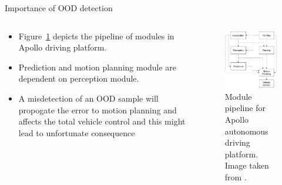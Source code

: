 \documentclass[aspectratio=169]{beamer}
\begin{document}
\begin{frame}{Importance of OOD detection}
    \begin{columns}
       \begin{column}{0.5\textwidth}
        \begin{itemize}
            \item Figure~\ref{fig:eg_apollo_pipeline} depicts the pipeline of modules in Apollo driving platform.
            \item Prediction and motion planning module are dependent on perception module.
            \item A misdetection of an OOD sample will propogate the error to motion planning and affects the total vehicle control and this might lead to unfortunate consequence
        \end{itemize}
       \end{column}
       \begin{column}{0.5\textwidth}
            \begin{figure}
                \centering
                \includegraphics[scale=0.35]{images/apollo_pipeline.jpg}
                \caption{Module pipeline for Apollo autonomous driving platform. Image taken from \cite{baiduapollo}.}
                \label{fig:eg_apollo_pipeline}
            \end{figure}
       \end{column}
    \end{columns}
\end{frame}
\end{document}
